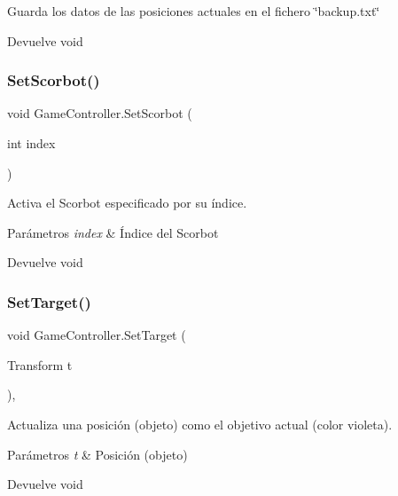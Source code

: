 Guarda los datos de las posiciones actuales en el fichero \char`\"{}backup.\+txt\char`\"{} \begin{DoxyReturn}{Devuelve}
void 
\end{DoxyReturn}
\mbox{\label{class_game_controller_aa448386fb4d83ff0ca9211424ad6b020}} 
\subsubsection{\texorpdfstring{SetScorbot()}{SetScorbot()}}
{\footnotesize\ttfamily void Game\+Controller.\+Set\+Scorbot (\begin{DoxyParamCaption}\item[{int}]{index }\end{DoxyParamCaption})\hspace{0.3cm}{\ttfamily [inline]}}

Activa el Scorbot especificado por su índice. 
\begin{DoxyParams}{Parámetros}
{\em index} & Índice del Scorbot \\
\hline
\end{DoxyParams}
\begin{DoxyReturn}{Devuelve}
void 
\end{DoxyReturn}
\mbox{\label{class_game_controller_af33ac3595c0cdcd615cf63738638482f}} 
\subsubsection{\texorpdfstring{SetTarget()}{SetTarget()}}
{\footnotesize\ttfamily void Game\+Controller.\+Set\+Target (\begin{DoxyParamCaption}\item[{Transform}]{t }\end{DoxyParamCaption})\hspace{0.3cm}{\ttfamily [inline]}, {\ttfamily [private]}}

Actualiza una posición (objeto) como el objetivo actual (color violeta). 
\begin{DoxyParams}{Parámetros}
{\em t} & Posición (objeto) \\
\hline
\end{DoxyParams}
\begin{DoxyReturn}{Devuelve}
void 
\end{DoxyReturn}
\mbox{\label{class_game_controller_a473137527a8eb571f745ba44752e0a79}} 
